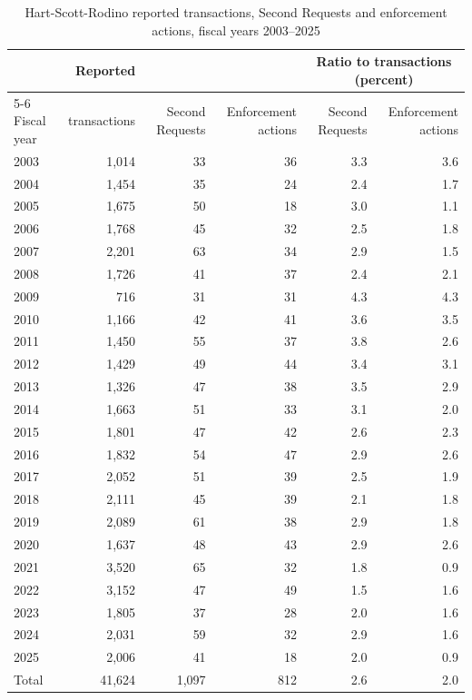\begin{table}[htbp]
\centering
\caption{Hart-Scott-Rodino reported transactions, Second Requests and enforcement actions, fiscal years 2003--2025}
\label{tab:11-hsr}
\footnotesize
\begin{tabular}{@{}lrrrrr@{}}
\toprule
 & Reported & & & \multicolumn{2}{c}{Ratio to transactions (percent)} \\
\cmidrule(l){5-6}
Fiscal year & transactions & Second Requests & Enforcement actions & Second Requests & Enforcement actions \\
\midrule
2003 & 1,014 & 33 & 36 & 3.3 & 3.6 \\
2004 & 1,454 & 35 & 24 & 2.4 & 1.7 \\
2005 & 1,675 & 50 & 18 & 3.0 & 1.1 \\
2006 & 1,768 & 45 & 32 & 2.5 & 1.8 \\
2007 & 2,201 & 63 & 34 & 2.9 & 1.5 \\
2008 & 1,726 & 41 & 37 & 2.4 & 2.1 \\
2009 & 716 & 31 & 31 & 4.3 & 4.3 \\
2010 & 1,166 & 42 & 41 & 3.6 & 3.5 \\
2011 & 1,450 & 55 & 37 & 3.8 & 2.6 \\
2012 & 1,429 & 49 & 44 & 3.4 & 3.1 \\
2013 & 1,326 & 47 & 38 & 3.5 & 2.9 \\
2014 & 1,663 & 51 & 33 & 3.1 & 2.0 \\
2015 & 1,801 & 47 & 42 & 2.6 & 2.3 \\
2016 & 1,832 & 54 & 47 & 2.9 & 2.6 \\
2017 & 2,052 & 51 & 39 & 2.5 & 1.9 \\
2018 & 2,111 & 45 & 39 & 2.1 & 1.8 \\
2019 & 2,089 & 61 & 38 & 2.9 & 1.8 \\
2020 & 1,637 & 48 & 43 & 2.9 & 2.6 \\
2021 & 3,520 & 65 & 32 & 1.8 & 0.9 \\
2022 & 3,152 & 47 & 49 & 1.5 & 1.6 \\
2023 & 1,805 & 37 & 28 & 2.0 & 1.6 \\
2024 & 2,031 & 59 & 32 & 2.9 & 1.6 \\
2025 & 2,006 & 41 & 18 & 2.0 & 0.9 \\
\midrule
Total & 41,624 & 1,097 & 812 & 2.6 & 2.0 \\
\bottomrule
\end{tabular}


\end{table}
